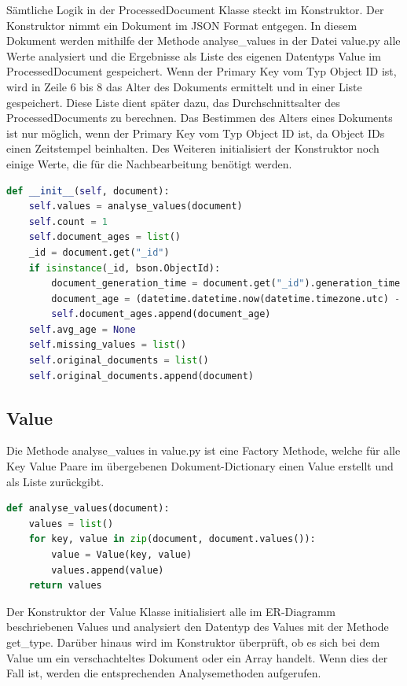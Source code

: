 Sämtliche Logik in der ProcessedDocument Klasse steckt im Konstruktor.
Der Konstruktor nimmt ein Dokument im JSON Format entgegen.
In diesem Dokument werden mithilfe der Methode analyse\_values in der Datei value.py alle Werte analysiert und die Ergebnisse als Liste des eigenen Datentyps Value im ProcessedDocument gespeichert.
Wenn der Primary Key vom Typ Object ID ist, wird in Zeile 6 bis 8 das Alter des Dokuments ermittelt und in einer Liste gespeichert.
Diese Liste dient später dazu, das Durchschnittsalter des ProcessedDocuments zu berechnen.
Das Bestimmen des Alters eines Dokuments ist nur möglich, wenn der Primary Key vom Typ Object ID ist, da Object IDs einen Zeitstempel beinhalten.
Des Weiteren initialisiert der Konstruktor noch einige Werte, die für die Nachbearbeitung benötigt werden.

\begin{lstlisting}[language=python, caption={ProcessedDocument.\_\_init\_\_},label={lst:backend_processed_document_init}]
def __init__(self, document):
    self.values = analyse_values(document)
    self.count = 1
    self.document_ages = list()
    _id = document.get("_id")
    if isinstance(_id, bson.ObjectId):
        document_generation_time = document.get("_id").generation_time
        document_age = (datetime.datetime.now(datetime.timezone.utc) - document_generation_time).total_seconds()
        self.document_ages.append(document_age)
    self.avg_age = None
    self.missing_values = list()
    self.original_documents = list()
    self.original_documents.append(document)
\end{lstlisting}

\subsection{Value}
\label{sub:ba_value}

Die Methode analyse\_values in value.py ist eine Factory Methode, welche für alle Key Value Paare im übergebenen Dokument-Dictionary einen Value erstellt und als Liste zurückgibt.

\begin{lstlisting}[language=python, caption={Value.analyse\_values},label={lst:backend_value_analyse_values}]
def analyse_values(document):
    values = list()
    for key, value in zip(document, document.values()):
        value = Value(key, value)
        values.append(value)
    return values
\end{lstlisting}

Der Konstruktor der Value Klasse initialisiert alle im ER-Diagramm beschriebenen Values und analysiert den Datentyp des Values mit der Methode get\_type.
Darüber hinaus wird im Konstruktor überprüft, ob es sich bei dem Value um ein verschachteltes Dokument oder ein Array handelt. 
Wenn dies der Fall ist, werden die entsprechenden Analysemethoden aufgerufen.

